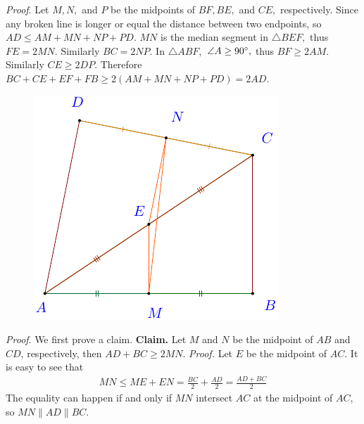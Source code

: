 \begin{multicols}{2}
\begin{figure}[H]
		\vspace*{-10pt}
	\end{figure}
	\textit{Proof}.
	Let $M, N,$ and $P$ be the midpoints of $BF, BE,$ and $CE,$ respectively.
	Since any broken line is longer or equal the distance between two endpoints, so $AD\le AM+MN+NP+PD.$
	$MN$ is the median segment in $\triangle BEF,$ thus $FE = 2MN.$ Similarly $BC=2NP.$
	In $\triangle ABF,$ $\angle A \ge 90^\circ,$ thus $BF \ge 2AM.$ Similarly $CE \ge 2DP.$
	Therefore $BC+CE+EF+FB \ge 2(AM+MN+NP+PD) = 2AD.$
	\vskip 0.2cm
	\begin{figure}[H]
		\vspace*{-5pt}
		\centering
		\captionsetup{labelformat= empty, justification=centering}
		\includegraphics[width= 0.8\linewidth]{romanian-pb-gt-40.pdf}
		\vspace*{-10pt}
	\end{figure}
	\textit{Proof}.
	We first prove a claim.
	\vskip 0.1cm
	\textbf{\color{toancuabi}Claim.} Let $M$ and $N$ be the midpoint of $AB$ and $CD$, respectively, then $AD+ BC \ge 2MN.$
	\vskip 0.1cm
	\textit{Proof.}
	Let $E$ be the midpoint of $AC.$ It is easy to see that 
	\begin{align*}
		MN \le ME+EN = \frac{BC}{2} + \frac{AD}{2} = \frac{AD+BC}{2}
	\end{align*}
	The equality can happen if and only if $MN$ intersect $AC$ at the midpoint of $AC$, so $MN \parallel AD \parallel BC.$

\end{multicols}
